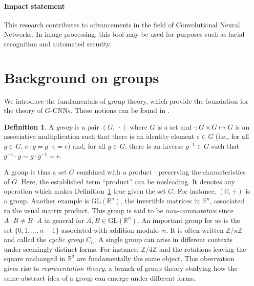 \documentclass{article}
\theoremstyle{plain}
\theoremstyle{definition}
\newtheorem{definition}[theorem]{Definition}
\theoremstyle{remark}
\begin{document}
\paragraph{Impact statement} This research contributes to advancements in the field of Convolutional Neural Networks. In image processing, this tool may be used for purposes such as facial recognition and automated security.
\newpage


\newpage
\appendix
\section{Background on groups}\label{app:background}
We introduce the fundamentals of group theory, which provide the foundation for the theory of $G$-CNNs. These notions can be found in \cite{steinberg2011representation}.
\begin{definition}\label{def:group}
    A \emph{group} is a pair $(G,\ \cdot)$ where $G$ is a set and $\cdot:G\times G\mapsto G$ is an associative multiplication such that there is an identity element $e\in G$ (i.e., for all $g\in G$, $e\cdot g=g\cdot e=e$) and, for all $g\in G$, there is an inverse $g^{-1}\in G$ such that $g^{-1}\cdot g = g\cdot g^{-1}=e$.
\end{definition}
A group is thus a set $G$ combined with a product $\cdot$ preserving the characteristics of $G$. Here, the established term ``product'' can be misleading. It denotes any operation which makes Definition~\ref{def:group} true given the set $G$. For instance, $(\mathbb{R},+)$ is a group. Another example is $\mathrm{GL}(\mathbb{R}^n)$, the invertible matrices in $\mathbb{R}^n$, associated to the usual matrix product. This group is said to be \emph{non-commutative} since $A\cdot B\neq B\cdot A$ in general for $A,B\in\mathrm{GL}(\mathbb{R}^n)$. An important group for us is the set $\{0,1,...,n-1\}$ associated with addition modulo~$n$. It is often written $\mathbb{Z}/n\mathbb{Z}$ and called the \emph{cyclic group} $C_n$. A single group can arise in different contexts under seemingly distinct forms. For instance, $\mathbb{Z}/4\mathbb{Z}$ and the rotations leaving the square unchanged in $\mathbb{R}^2$ are fundamentally the same object. This observation gives rise to \emph{representation theory}, a branch of group theory studying how the same abstract idea of a group can emerge under different forms.
\end{document}
